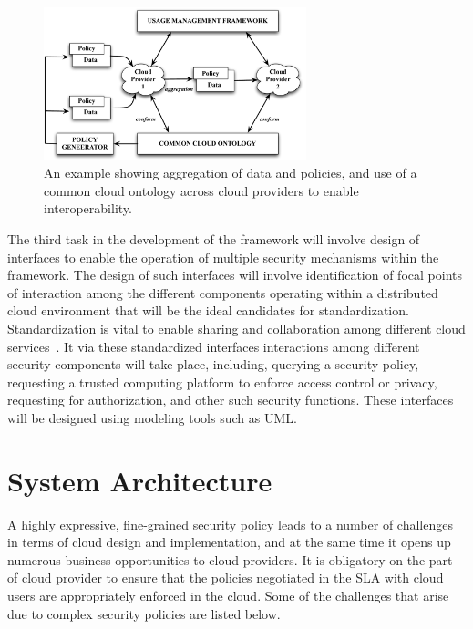 \documentclass[times, 10pt,twocolumn]{article}
\begin{document}
\begin{figure}[!t]
\centering
\includegraphics[width=3in]{dynamics.pdf}
\caption{An example showing aggregation of data and policies, and use of a common cloud ontology across cloud providers to enable interoperability.}
\label{fig:dynamics}
\end{figure}

The third task in the development of the framework will involve design of interfaces to enable the operation of multiple security mechanisms within the framework. The design of such interfaces will involve identification of  focal points of interaction among the different components operating within a distributed cloud environment that will be the ideal candidates for standardization. Standardization is vital to enable sharing and collaboration among different cloud services~\cite{HPCloud1}. It via these standardized interfaces interactions among different security components will take place, including, querying a security policy, requesting a trusted computing platform to enforce access control or privacy, requesting for authorization, and other such security functions. These interfaces will be designed using modeling tools such as UML.


\section{System Architecture}
A highly expressive, fine-grained security policy leads to a number of challenges in terms of cloud design and implementation, and at the same time it  opens up numerous business opportunities to cloud providers. It is obligatory on the part of cloud provider to ensure that the policies negotiated in the SLA with cloud users are appropriately enforced in the cloud. Some of the challenges that arise due to complex security policies are listed below. 
\end{document}
